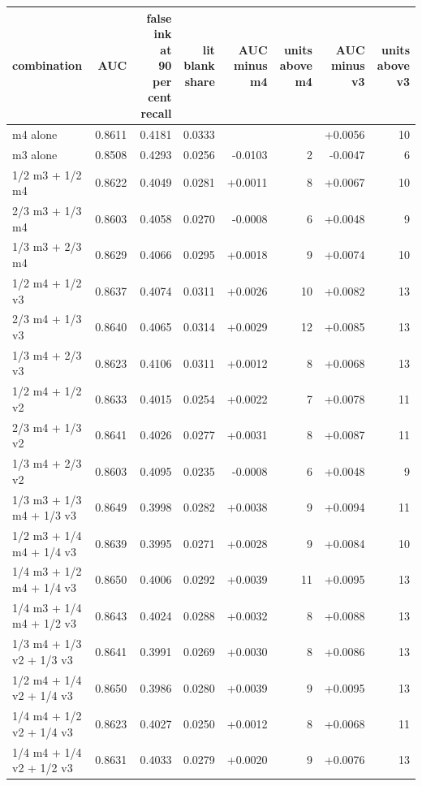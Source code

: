 {\small\setlength{\tabcolsep}{4pt}
\noindent\begin{tabular}{@{}lrrrrrrr@{}}
\hline
combination & AUC & \shortstack{false ink at\\90 per cent recall} & \shortstack{lit blank\\share} & \shortstack{AUC minus\\m4} & \shortstack{units above\\m4} & \shortstack{AUC minus\\v3} & \shortstack{units above\\v3} \\
\hline
m4 alone & 0.8611 & 0.4181 & 0.0333 &  &  & +0.0056 & 10 \\
m3 alone & 0.8508 & 0.4293 & 0.0256 & -0.0103 & 2 & -0.0047 & 6 \\
1/2 m3 + 1/2 m4 & 0.8622 & 0.4049 & 0.0281 & +0.0011 & 8 & +0.0067 & 10 \\
2/3 m3 + 1/3 m4 & 0.8603 & 0.4058 & 0.0270 & -0.0008 & 6 & +0.0048 & 9 \\
1/3 m3 + 2/3 m4 & 0.8629 & 0.4066 & 0.0295 & +0.0018 & 9 & +0.0074 & 10 \\
1/2 m4 + 1/2 v3 & 0.8637 & 0.4074 & 0.0311 & +0.0026 & 10 & +0.0082 & 13 \\
2/3 m4 + 1/3 v3 & 0.8640 & 0.4065 & 0.0314 & +0.0029 & 12 & +0.0085 & 13 \\
1/3 m4 + 2/3 v3 & 0.8623 & 0.4106 & 0.0311 & +0.0012 & 8 & +0.0068 & 13 \\
1/2 m4 + 1/2 v2 & 0.8633 & 0.4015 & 0.0254 & +0.0022 & 7 & +0.0078 & 11 \\
2/3 m4 + 1/3 v2 & 0.8641 & 0.4026 & 0.0277 & +0.0031 & 8 & +0.0087 & 11 \\
1/3 m4 + 2/3 v2 & 0.8603 & 0.4095 & 0.0235 & -0.0008 & 6 & +0.0048 & 9 \\
1/3 m3 + 1/3 m4 + 1/3 v3 & 0.8649 & 0.3998 & 0.0282 & +0.0038 & 9 & +0.0094 & 11 \\
1/2 m3 + 1/4 m4 + 1/4 v3 & 0.8639 & 0.3995 & 0.0271 & +0.0028 & 9 & +0.0084 & 10 \\
1/4 m3 + 1/2 m4 + 1/4 v3 & 0.8650 & 0.4006 & 0.0292 & +0.0039 & 11 & +0.0095 & 13 \\
1/4 m3 + 1/4 m4 + 1/2 v3 & 0.8643 & 0.4024 & 0.0288 & +0.0032 & 8 & +0.0088 & 13 \\
1/3 m4 + 1/3 v2 + 1/3 v3 & 0.8641 & 0.3991 & 0.0269 & +0.0030 & 8 & +0.0086 & 13 \\
1/2 m4 + 1/4 v2 + 1/4 v3 & 0.8650 & 0.3986 & 0.0280 & +0.0039 & 9 & +0.0095 & 13 \\
1/4 m4 + 1/2 v2 + 1/4 v3 & 0.8623 & 0.4027 & 0.0250 & +0.0012 & 8 & +0.0068 & 11 \\
1/4 m4 + 1/4 v2 + 1/2 v3 & 0.8631 & 0.4033 & 0.0279 & +0.0020 & 9 & +0.0076 & 13 \\
\hline
\end{tabular}}
